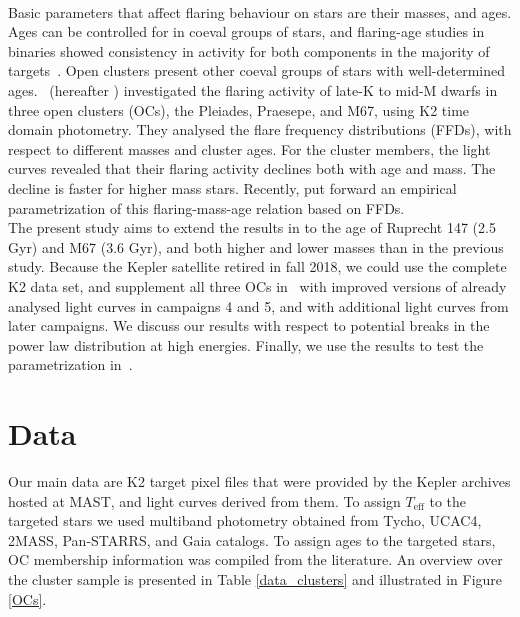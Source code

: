 \documentclass{aa}
\begin{document}
\\
Basic parameters that affect flaring behaviour on stars are their masses, and ages. Ages can be controlled for in coeval groups of stars, and flaring-age studies in binaries showed consistency in activity for both components in the majority of targets~\citep{lurie_kepler_2015, clarke_flare_2018}. Open clusters present other coeval groups of stars with well-determined ages. \citet{ilin_flares_2019}~(hereafter ) investigated the flaring activity of late-K to mid-M dwarfs in three open clusters (OCs), the Pleiades, Praesepe, and M67, using K2 time domain photometry. They analysed the flare frequency distributions (FFDs), with respect to different masses and cluster ages. For the cluster members, the light curves revealed that their flaring activity declines both with age and mass. The decline is faster for higher mass stars. Recently, \citet{davenport_flaresevolve_2019} put forward an empirical parametrization of this flaring-mass-age relation based on FFDs.
\\
The present study aims to extend the results in  to the age of Ruprecht 147 (2.5 Gyr) and M67 (3.6 Gyr), and both higher and lower masses than in the previous study. Because the Kepler satellite retired in fall 2018, we could use the complete K2 data set, and supplement all three OCs in~ with improved versions of already analysed light curves in campaigns 4 and 5, and with additional light curves from later campaigns. We discuss our results with respect to potential breaks in the power law distribution at high energies. Finally, we use the results to test the parametrization in~\citet{davenport_flaresevolve_2019}.


\section{Data}
Our main data are K2 target pixel files that were provided by the Kepler archives hosted at MAST, and light curves derived from them. To assign $T_\mathrm{eff}$ to the targeted stars we used multiband photometry obtained from Tycho, UCAC4, 2MASS, Pan-STARRS, and Gaia catalogs. To assign ages to the targeted stars,  OC membership information was compiled from the literature. An overview over the cluster sample is presented in Table \ref{data_clusters} and illustrated in Figure \ref{OCs}.
\end{document}
